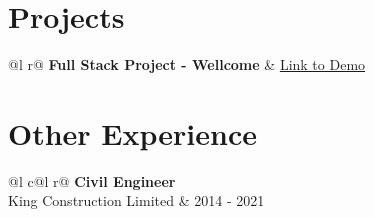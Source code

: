 \documentclass[a4paper,12pt]{article}
\begin{document}
\section{Projects}


    \begin{tabularx}{\linewidth}{ @{}l r@{} }
    \textbf{Full Stack Project - Wellcome}   & \hfill 
     \href{https://github.com/anth0nywong/resume-generator} {Link to Demo} \\[3.75pt]
    \end{tabularx}




\section{Other Experience}

    \begin{tabularx}{\linewidth}{ @{}l c@{}l r@{} }
    \textbf{Civil Engineer} \\ [3.75pt]
    King Construction Limited &  \hfill 2014 - 2021 \\ [-10pt]
    \end{tabularx}


\end{document}

